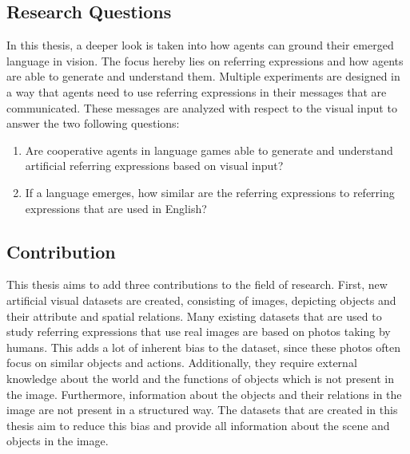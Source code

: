 \subsection{Research Questions}
In this thesis, a deeper look is taken into how agents can ground their emerged language in vision.
The focus hereby lies on referring expressions and how agents are able to generate and understand them.
Multiple experiments are designed in a way that agents need to use referring expressions in their messages that are communicated.
These messages are analyzed with respect to the visual input to answer the two following questions:
\begin{enumerate}
    \item Are cooperative agents in language games able to generate and understand artificial referring expressions based on visual input?
    \item If a language emerges, how similar are the referring expressions to referring expressions that are used in English?
\end{enumerate}


\subsection{Contribution}
This thesis aims to add three contributions to the field of research.
First, new artificial visual datasets are created, consisting of images, depicting objects and their attribute and spatial relations.
Many existing datasets that are used to study referring expressions that use real images are based on photos taking by humans.
This adds a lot of inherent bias to the dataset, since these photos often focus on similar objects and actions.
Additionally, they require external knowledge about the world and the functions of objects which is not present in the image.
Furthermore, information about the objects and their relations in the image are not present in a structured way.
The datasets that are created in this thesis aim to reduce this bias and provide all information about the scene and objects in the image.

